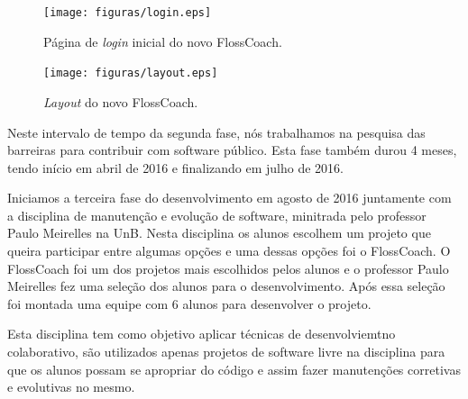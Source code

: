 \begin{figure}[h]
	\centering
	\label{fig:prototipo}
		\texttt{[image: figuras/login.eps]}
	\caption{Página de \textit{login} inicial do novo FlossCoach.}
\end{figure}


\begin{figure}[h]
	\centering
	\label{fig:prototipo}
		\texttt{[image: figuras/layout.eps]}
	\caption{\textit{Layout} do novo FlossCoach.}
\end{figure}


Neste intervalo de tempo da segunda fase, nós trabalhamos na pesquisa das barreiras para
contribuir com software público. Esta fase também durou 4 meses, tendo início em abril 
de 2016 e finalizando em julho de 2016.

Iniciamos a terceira fase do desenvolvimento em agosto de 2016 juntamente com a disciplina 
de manutenção e evolução de software, minitrada pelo professor Paulo Meirelles na UnB. 
Nesta disciplina os alunos escolhem um projeto que queira participar entre algumas opções 
e uma dessas opções foi o FlossCoach. O FlossCoach foi um dos 
projetos mais escolhidos pelos alunos e o professor Paulo Meirelles fez uma seleção
dos alunos para o desenvolvimento. Após essa seleção foi montada uma equipe com
6 alunos para desenvolver o projeto.

Esta disciplina tem como objetivo aplicar técnicas de desenvolviemtno colaborativo,
são utilizados apenas projetos de software livre na disciplina para que os alunos 
possam se apropriar do código e assim fazer manutenções corretivas e evolutivas no
mesmo.

